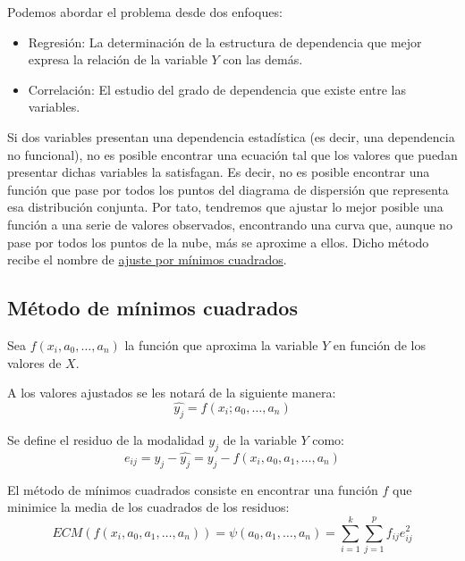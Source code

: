 Podemos abordar el problema desde dos enfoques:
\begin{itemize}
    \item Regresión: La determinación de la estructura de dependencia que mejor expresa la relación de la variable $Y$
          con las demás.
    \item Correlación: El estudio del grado de dependencia que existe entre las variables.
\end{itemize}


Si dos variables presentan una dependencia estadística (es decir, una dependencia no funcional), no es posible encontrar una ecuación tal que los valores que puedan presentar dichas variables la satisfagan. Es decir, no es posible encontrar una función que pase por todos los puntos del diagrama de dispersión que representa esa distribución conjunta. Por tato, tendremos que ajustar lo mejor posible una función a una serie de valores observados, encontrando una curva
que, aunque no pase por todos los puntos de la nube, más se aproxime a ellos. Dicho método recibe el nombre de \underline{ajuste por mínimos cuadrados}.

\subsection{Método de mínimos cuadrados}
Sea $f(x_i, a_0,\dots,a_n)$ la función que aproxima la variable $Y$ en función de los valores de $X$.
\begin{notacion}
    A los valores ajustados se les notará de la siguiente manera:
    \begin{equation*}
        \hat{y_j} = f(x_i;a_0,\dots,a_n)
    \end{equation*}
\end{notacion}

\begin{definicion}[Residuo]
Se define el residuo de la modalidad $y_j$ de la variable $Y$ como:
\begin{equation*}
    e_{ij} = y_j - \hat{y_j}
    = y_j - f(x_i, a_0, a_1, \ldots, a_n)
\end{equation*}
\end{definicion}



El método de mínimos cuadrados consiste en encontrar una función $f$ que minimice la media de los cuadrados de los
residuos:
\begin{equation*}
        ECM(f(x_i, a_0, a_1, \ldots, a_n)) = \psi(a_0, a_1, \ldots, a_n)
        = \sum_{i=1}^k \sum_{j=1}^p f_{ij} e_{ij}^2
\end{equation*}


